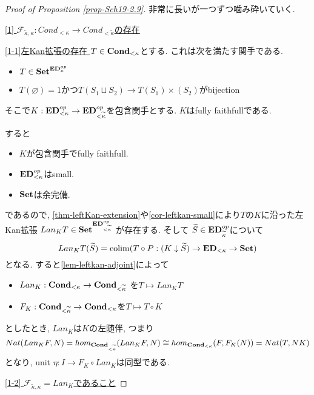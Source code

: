 \documentclass[dvipdfmx,a4paper,11pt]{report}
\newcommand{\colim}{{\rm colim}}
\theoremstyle{definition}
\begin{document}
\begin{proof}[Proof of Proposition \ref{prop-Sch19-2.9}]
非常に長いが一つずつ噛み砕いていく. 

\underline{[1] $\mathcal{F}_{\widetilde{\kappa}, \kappa} :  Cond_{<\kappa} \to Cond_{<\widetilde{\kappa}}$の存在} 

\underline{[1-1]左Kan拡張の存在 }$T \in {\bf Cond_{<\kappa}}$とする.
これは次を満たす関手である.
\begin{itemize}
\item $T \in {\bf Set}^{{\bf ED}_{\kappa}^{op}}$
\item $T(\varnothing)=1$かつ$T(S_1 \sqcup S_2) \to T(S_1) \times (S_2)$がbijection
\end{itemize}
そこで$K : {\bf ED}_{<\kappa}^{op} \to {\bf ED}_{<\widetilde{\kappa}}^{op}$を包含関手とする. 
$K$はfully faithfullである.

すると
\begin{itemize}
\item $K$が包含関手でfully faithfull.
\item ${\bf ED}_{<\kappa}^{op}$はsmall.
\item ${\bf Set }$は余完備.
\end{itemize}
であるので, \ref{thm-leftKan-extension}や\ref{cor-leftkan-small}により$T$の$K$に沿った左Kan拡張
$Lan_{K}T \in {\bf Set}^{{\bf ED}_{<\widetilde{\kappa}}^{op}}$
が存在する. そして
$\widetilde{S} \in {\bf ED}_{\widetilde{\kappa}}^{op}$について
$$
Lan_{K}T(\widetilde{S}) = \colim(T \circ P : (K \downarrow \widetilde{S}) \to {\bf ED}_{<\kappa} \to {\bf Set})
$$
となる.
すると\ref{lem-leftkan-adjoint}によって
\begin{itemize}
\item $Lan_{K} : {\bf  Cond_{<\kappa}} \to { \bf Cond_{<\widetilde{\kappa}} }$ を$T \mapsto Lan_{K}T$
\item $F_K : {\bf Cond_{<\widetilde{\kappa}} }\to {\bf Cond_{< \kappa}} $を$T \mapsto T \circ K$
\end{itemize}
としたとき, 
$Lan_{K}$は$K$の左随伴, つまり
$$
Nat(Lan_{K}F, N)
=
hom_{{\bf Cond_{<\widetilde{\kappa}}} }(Lan_{K}F, N)
 \cong
 hom_{{\bf Cond_{< \kappa}}}(F, F_{K}(N)) 
 = Nat(T,NK)
$$
となり, unit $\eta:  I \to  F_K \circ Lan_{K} $は同型である. 

\underline{[1-2] $\mathcal{F}_{\widetilde{\kappa}, \kappa} = Lan_{K}$であること}


\end{proof}
\end{document}
